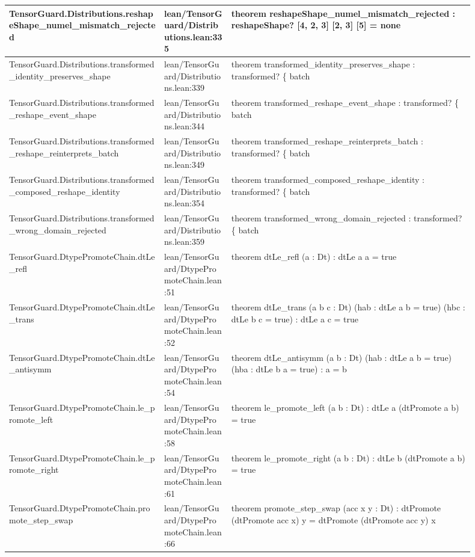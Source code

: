 \documentclass[10pt]{article}
\begin{document}
\begin{longtable}{|p{0.30\linewidth}|p{0.13\linewidth}|p{0.47\linewidth}|}
\hline
TensorGuard.Distributions.reshapeShape\_numel\_mismatch\_rejected & lean/TensorGuard/Distributions.lean:335 & theorem reshapeShape\_numel\_mismatch\_rejected : reshapeShape? [4, 2, 3] [2, 3] [5] = none \\
\hline
TensorGuard.Distributions.transformed\_identity\_preserves\_shape & lean/TensorGuard/Distributions.lean:339 & theorem transformed\_identity\_preserves\_shape : transformed? \{ batch \\
\hline
TensorGuard.Distributions.transformed\_reshape\_event\_shape & lean/TensorGuard/Distributions.lean:344 & theorem transformed\_reshape\_event\_shape : transformed? \{ batch \\
\hline
TensorGuard.Distributions.transformed\_reshape\_reinterprets\_batch & lean/TensorGuard/Distributions.lean:349 & theorem transformed\_reshape\_reinterprets\_batch : transformed? \{ batch \\
\hline
TensorGuard.Distributions.transformed\_composed\_reshape\_identity & lean/TensorGuard/Distributions.lean:354 & theorem transformed\_composed\_reshape\_identity : transformed? \{ batch \\
\hline
TensorGuard.Distributions.transformed\_wrong\_domain\_rejected & lean/TensorGuard/Distributions.lean:359 & theorem transformed\_wrong\_domain\_rejected : transformed? \{ batch \\
\hline
TensorGuard.DtypePromoteChain.dtLe\_refl & lean/TensorGuard/DtypePromoteChain.lean:51 & theorem dtLe\_refl (a : Dt) : dtLe a a = true \\
\hline
TensorGuard.DtypePromoteChain.dtLe\_trans & lean/TensorGuard/DtypePromoteChain.lean:52 & theorem dtLe\_trans (a b c : Dt) (hab : dtLe a b = true) (hbc : dtLe b c = true) : dtLe a c = true \\
\hline
TensorGuard.DtypePromoteChain.dtLe\_antisymm & lean/TensorGuard/DtypePromoteChain.lean:54 & theorem dtLe\_antisymm (a b : Dt) (hab : dtLe a b = true) (hba : dtLe b a = true) : a = b \\
\hline
TensorGuard.DtypePromoteChain.le\_promote\_left & lean/TensorGuard/DtypePromoteChain.lean:58 & theorem le\_promote\_left (a b : Dt) : dtLe a (dtPromote a b) = true \\
\hline
TensorGuard.DtypePromoteChain.le\_promote\_right & lean/TensorGuard/DtypePromoteChain.lean:61 & theorem le\_promote\_right (a b : Dt) : dtLe b (dtPromote a b) = true \\
\hline
TensorGuard.DtypePromoteChain.promote\_step\_swap & lean/TensorGuard/DtypePromoteChain.lean:66 & theorem promote\_step\_swap (acc x y : Dt) : dtPromote (dtPromote acc x) y = dtPromote (dtPromote acc y) x \\

\end{longtable}
\end{document}
